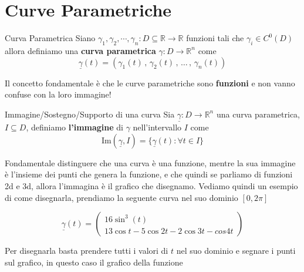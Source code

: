 \documentclass{rapport}
\begin{document}
  \section{Curve Parametriche}

  \begin{definizione}{Curva Parametrica}{}
    Siano $\gamma_1, \gamma_2, \cdots, \gamma_n: D\subseteq\mathbb{R} \to \mathbb{R}$ funzioni tali che $\gamma_i \in C^0(D)$ allora definiamo una \textbf{curva parametrica} $\gamma: D\to \mathbb{R}^n$ come
    \[
    \underline{\gamma}(t) = (\gamma_1(t)\, , \, \gamma_2(t)\, ,\, \dots \, ,\, \gamma_n(t) )
    \]  
  \end{definizione}


  Il concetto fondamentale è che le curve parametriche sono \textbf{funzioni} e non vanno confuse con la loro immagine!

  \begin{definizione}{Immagine/Sostegno/Supporto di una curva}{}
    Sia $\underline{\gamma}: D\to \mathbb{R}^n$ una curva parametrica, $I \subseteq D$,  definiamo \textbf{l'immagine} di $\gamma$ nell'intervallo $I$ come 
    \[
    \text{Im}(\underline{\gamma}, I) = \{\underline{\gamma}(t): \forall t \in I\} 
    \]
  \end{definizione}

  Fondamentale distinguere che una curva è una funzione, mentre la sua immagine è l'insieme dei punti che genera la funzione, e che quindi se parliamo di funzioni 2d e 3d, allora l'immagina è il grafico che disegnamo. Vediamo quindi un esempio di come disegnarla, prendiamo la seguente curva nel suo dominio $[0, 2\pi]$
  
  \[
  \underline{\gamma}(t) = \begin{pmatrix}
    16\sin^3(t) \\
    13\cos t -5\cos 2t -2\cos 3t -cos 4t
  \end{pmatrix}
  \]

  Per disegnarla basta prendere tutti i valori di $t$ nel suo dominio e segnare i punti sul grafico, in questo caso il grafico della funzione 
\begin{center}
  
\end{center}
\end{document}
